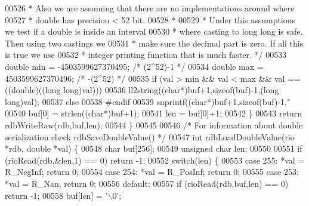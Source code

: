 \begin{DoxyCode}
{{{{{{00526 \textcolor{comment}{         * Also we are assuming that there are no implementations around where}
00527 \textcolor{comment}{         * double has precision < 52 bit.}
00528 \textcolor{comment}{         *}
00529 \textcolor{comment}{         * Under this assumptions we test if a double is inside an interval}
00530 \textcolor{comment}{         * where casting to long long is safe. Then using two castings we}
00531 \textcolor{comment}{         * make sure the decimal part is zero. If all this is true we use}
00532 \textcolor{comment}{         * integer printing function that is much faster. */}
00533         \textcolor{keywordtype}{double} min = -4503599627370495; \textcolor{comment}{/* (2^52)-1 */}
00534         \textcolor{keywordtype}{double} max = 4503599627370496; \textcolor{comment}{/* -(2^52) */}
00535         \textcolor{keywordflow}{if} (val > min && val < max && val == ((\textcolor{keywordtype}{double})((\textcolor{keywordtype}{long} \textcolor{keywordtype}{long})val)))
00536             ll2string((\textcolor{keywordtype}{char}*)buf+1,\textcolor{keyword}{sizeof}(buf)-1,(\textcolor{keywordtype}{long} \textcolor{keywordtype}{long})val);
00537         \textcolor{keywordflow}{else}
00538 \textcolor{preprocessor}{#}\textcolor{preprocessor}{endif}
00539             snprintf((\textcolor{keywordtype}{char}*)buf+1,\textcolor{keyword}{sizeof}(buf)-1,\textcolor{stringliteral}{"%
00540         buf[0] = strlen((\textcolor{keywordtype}{char}*)buf+1);
00541         len = buf[0]+1;
00542     \}
00543     \textcolor{keywordflow}{return} rdbWriteRaw(rdb,buf,len);
00544 \}
00545 
00546 \textcolor{comment}{/* For information about double serialization check rdbSaveDoubleValue() */}
00547 \textcolor{keywordtype}{int} rdbLoadDoubleValue(rio *rdb, \textcolor{keywordtype}{double} *val) \{
00548     \textcolor{keywordtype}{char} buf[256];
00549     \textcolor{keywordtype}{unsigned} \textcolor{keywordtype}{char} len;
00550 
00551     \textcolor{keywordflow}{if} (rioRead(rdb,&len,1) == 0) \textcolor{keywordflow}{return} -1;
00552     \textcolor{keywordflow}{switch}(len) \{
00553     \textcolor{keywordflow}{case} 255: *val = R\_NegInf; \textcolor{keywordflow}{return} 0;
00554     \textcolor{keywordflow}{case} 254: *val = R\_PosInf; \textcolor{keywordflow}{return} 0;
00555     \textcolor{keywordflow}{case} 253: *val = R\_Nan; \textcolor{keywordflow}{return} 0;
00556     \textcolor{keywordflow}{default}:
00557         \textcolor{keywordflow}{if} (rioRead(rdb,buf,len) == 0) \textcolor{keywordflow}{return} -1;
00558         buf[len] = \textcolor{stringliteral}{'\(\backslash\)0'};
}}}}}}}
\end{DoxyCode}
